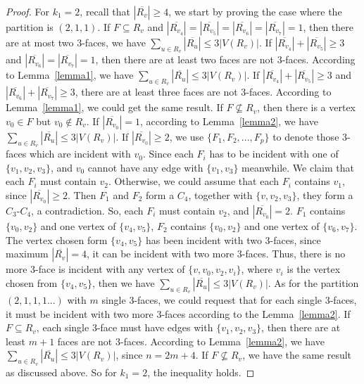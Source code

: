 \documentclass[12pt]{article}
\begin{document}
\begin{proof}
    For $k_1=2$, recall that $|\overline{R_v}|\geq 4$, we start by proving the case where the partition is $(2,1,1)$. If $F\subseteq R_v$ and $|\overline{R_{v_4}}|=|\overline{R_{v_5}}|=|\overline{R_{v_6}}|=|\overline{R_{v_7}}|=1$, then there are at most two $3$-faces, we have $\sum_{u \in R_v}|\overline{R_u}| \leq 3|V(R_v)|$. If $|\overline{R_{v_4}}|+|\overline{R_{v_5}}|\geq 3$ and $|\overline{R_{v_6}}|=|\overline{R_{v_7}}|=1$, then there are at least two faces are not $3$-faces. According to Lemma~\ref{lemma1}, we have $\sum_{u \in R_v}|\overline{R_u}| \leq 3|V(R_v)|$. If $|\overline{R_{v_4}}|+|\overline{R_{v_5}}|\geq 3$ and $|\overline{R_{v_6}}|+|\overline{R_{v_7}}|\geq 3$, there are at least three faces are not $3$-faces. According to Lemma~\ref{lemma1}, we could get the same result. If $F\not\subseteq R_v$, then there is a vertex $v_0\in F$ but $v_0 \not\in R_v$. If $|\overline{R_{v_0}}|=1$, according to Lemma~\ref{lemma2}, we have $\sum_{u \in R_v}|\overline{R_u}| \leq 3|V(R_v)|$. If $|\overline{R_{v_0}}|\geq2$, we use $\{F_1,F_2,...,F_p\}$ to denote those $3$-faces which are incident with $v_0$. Since each $F_i$ has to be incident with one of $\{v_1,v_2,v_3\}$, and $v_0$ cannot have any edge with $\{v_1,v_3\}$ meanwhile.
    We claim that each $F_i$ must contain $v_2$. Otherwise, we could assume that each $F_i$ contains $v_1$, since $|\overline{R_{v_0}}| \geq 2$. Then $F_1$ and $F_2$ form a $C_4$, together with $\{v,v_2,v_3\}$, they form a $C_3\text{-}C_4$, a contradiction. So, each $F_i$ must contain $v_2$, and $|\overline{R_{v_0}}|=2$. $F_1$ contains $\{v_0,v_2\}$ and one vertex of $\{v_4,v_5\}$, $F_2$ contains $\{v_0,v_2\}$ and one vertex of $\{v_6,v_7\}$. The vertex chosen form $\{v_4,v_5\}$ has been incident with two $3$-faces, since maximum $|\overline{R_v}|=4$, it can be incident with two more $3$-faces. Thus, there is no more $3$-face is incident with any vertex of $\{v,v_0,v_2,v_i\}$, where $v_i$ is the vertex chosen from $\{v_4,v_5\}$, then we have $\sum_{u \in R_v}|\overline{R_u}| \leq 3|V(R_v)|$. As for the partition $(2,1,1,1...)$ with $m$ single $3$-faces, we could request that for each single $3$-faces, it must be incident with two more $3$-faces according to the Lemma~\ref{lemma2}. If $F \subseteq R_v$, each single $3$-face must have edges with $\{v_1,v_2,v_3\}$, then there are at least $m+1$ faces are not $3$-faces. According to Lemma~\ref{lemma2}, we have $\sum_{u \in R_v}|\overline{R_u}| \leq 3|V(R_v)|$, since $n=2m+4$. If $F \not\subseteq R_v$, we have the same result as discussed above. So for $k_1=2$, the inequality holds.
    

\end{proof}
\end{document}
